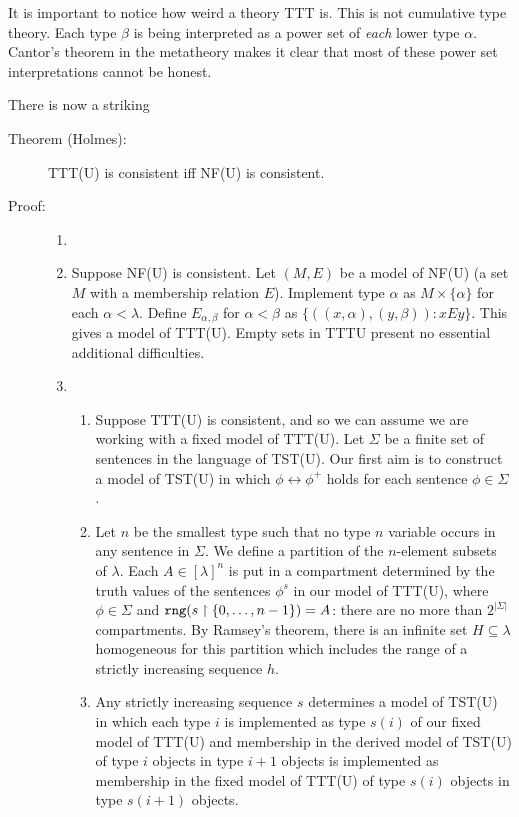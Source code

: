\documentclass[112pt]{article}
\begin{document}
It is important to notice how weird a theory TTT is.  This is not cumulative type theory.  Each type $\beta$ is being interpreted as a power set of {\em each\/} lower type $\alpha$.  Cantor's theorem in the metatheory makes it clear that most of these power set interpretations cannot be honest.

There is now a striking

\begin{description}

\item[Theorem (Holmes):]  TTT(U) is consistent iff NF(U) is consistent.

\item[Proof:]  
\begin{enumerate}

\item[]

\item Suppose NF(U) is consistent.  Let $(M,E)$ be a model of NF(U) (a set $M$ with a membership relation $E$).  Implement type $\alpha$ as $M \times \{\alpha\}$ for
each $\alpha<\lambda$.  Define $E_{\alpha,\beta}$ for $\alpha<\beta$ as $\{((x,\alpha),(y,\beta)):xEy\}$.  This gives a model of TTT(U).   Empty sets in TTTU present no essential additional difficulties.

\item \begin{enumerate}


\item Suppose TTT(U) is consistent, and so we can assume we are working with a fixed model of TTT(U).  Let $\Sigma$ be a finite set of sentences in the language of TST(U).  Our first aim is to construct a model of TST(U) in which $\phi \leftrightarrow \phi^+$ holds for each sentence $\phi \in \Sigma$.

\item Let $n$ be the smallest type such that no type $n$ variable occurs in any sentence in $\Sigma$.  We define a partition of the $n$-element subsets of $\lambda$.  Each $A \in [\lambda]^n$ is put in a compartment
determined by the truth values of the sentences $\phi^s$ in our model of TTT(U), where $\phi \in \Sigma$ and ${\tt rng}(s \restriction \{0,\ldots,n-1\}) = A$:  there are no more than $2^{|\Sigma|}$ compartments.  By Ramsey's theorem, there is an infinite set $H \subseteq \lambda$ homogeneous for this partition  which includes the range of a strictly increasing sequence $h$.  

\item Any strictly increasing sequence $s$ determines a model of TST(U) in which each type $i$ is implemented as type $s(i)$ of our fixed model of TTT(U)  and membership in the derived model of TST(U) of type $i$ objects in type $i+1$ objects is implemented as membership in the fixed model of TTT(U) of type $s(i)$ objects in type $s(i+1)$ objects.


\end{enumerate}
\end{enumerate}
\end{description}
\end{document}
